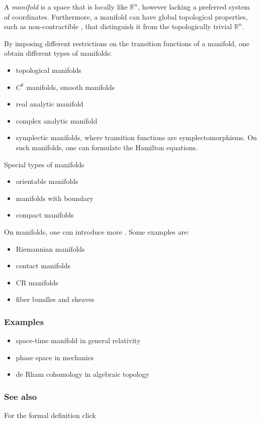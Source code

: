 \documentclass[12pt]{article}
\begin{document}
A {\em manifold} is a space that is
locally like $\mathbb{R}^n$, however lacking a preferred system of
coordinates. Furthermore, a manifold can have global topological
properties, such as non-contractible , that distinguish it from
the topologically trivial $\mathbb{R}^n$.
 

By imposing different restrictions on the transition functions of a manifold, one
obtain different types of manifolds:
\begin{itemize}
\item topological manifolds
\item $C^k$ manifolds, smooth manifolds
\item real analytic manifold
\item complex analytic manifold
\item symplectic manifolds, where transition functions
are symplectomorphisms. On such manifolds,  one can formulate the 
Hamilton equations. 
\end{itemize}

Special types of manifolds
\begin{itemize}
\item orientable manifolds
\item manifolds with boundary
\item compact manifolds
\end{itemize}

On manifolds, one can introduce more . Some examples are:
\begin{itemize}
\item Riemannian manifolds
\item contact manifolds
\item CR manifolds
\item fiber bundles and sheaves
\end{itemize}

\subsubsection*{Examples}
\begin{itemize}
\item space-time manifold in general relativity
\item phase space in mechanics
\item de Rham cohomology in algebraic topology
\end{itemize}

\subsubsection*{See also}
For the formal definition click \\
\end{document}
